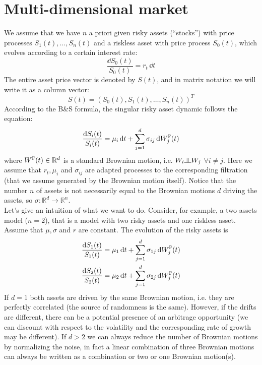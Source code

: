 \section{Multi-dimensional market} %
We assume that we have $n$ a priori given risky assets (“stocks”) with price processes $S_1(t),\dots,S_n(t)$ and a riskless asset with price process $S_0(t)$, which evolves according to a certain interest rate:
\begin{equation}
    \dfrac{\dd S_0(t)}{S_0(t)} = r_t\,\dd t
\end{equation}
The entire asset price vector is denoted by $S(t)$, and in matrix notation we will write it as a column vector:
\begin{equation}
    S(t) = (S_0(t), S_1(t),\dots,S_n(t))^T
\end{equation}
According to the B\&S formula, the singular risky asset dynamic follows the equation:
\begin{equation}
    \dfrac{\dd S_i(t)}{S_i(t)} = \mu_i\,\dd t + \sum^d_{j=1}\sigma_{ij}\,\dd W_j^{\mathbb{P}}(t)
\end{equation}
where $W^{\mathbb{P}}(t)\in\mathbb{R}^d$ is a standard Brownian motion, i.e. $W_i\indep W_j$ $\forall i\ne j$. Here we assume that $r_t, \mu_i$ and $\sigma_{ij}$ are adapted processes to the corresponding filtration (that we assume generated by the Brownian motion itself). Notice that the number $n$ of assets is not necessarily equal to the Brownian motions $d$ driving the assets, so $\sigma:\mathbb{R}^d\to\mathbb{R}^n$.\\
Let's give an intuition of what we want to do. Consider, for example, a two assets model ($n=2$), that is a model with two risky assets and one riskless asset. Assume that $\mu,\sigma$ and $r$ are constant. The evolution of the risky assets is
\begin{align}\label{bm}
    \dfrac{\dd S_1(t)}{S_1(t)} &= \mu_1\,\dd t + \sum^d_{j=1}\sigma_{1j}\,\dd W_j^{\mathbb{P}}(t) \\
    \dfrac{\dd S_2(t)}{S_2(t)} &= \mu_2\,\dd t + \sum^d_{j=1}\sigma_{2j}\,\dd W_j^{\mathbb{P}}(t)
\end{align}
If $d=1$ both assets are driven by the same Brownian motion, i.e. they are perfectly correlated (the source of randomness is the same). However, if the drifts are different, there can be a potential presence of an arbitrage opportunity (we can discount with respect to the volatility and the corresponding rate of growth may be different). If $d>2$ we can always reduce the number of Brownian motions by normalizing the noise, in fact a linear combination of three Brownian motions can always be written as a combination or two or one Brownian motion(s).
